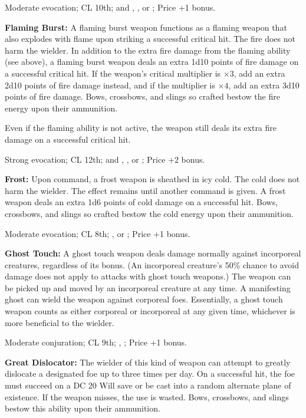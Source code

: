 Moderate evocation; CL 10th;  and , , or ; Price +1 bonus.

\textbf{Flaming Burst:} A flaming burst weapon functions as a flaming weapon that also explodes with flame upon striking a successful critical hit. The fire does not harm the wielder. In addition to the extra fire damage from the flaming ability (see above), a flaming burst weapon deals an extra 1d10 points of fire damage on a successful critical hit. If the weapon's critical multiplier is $\times3$, add an extra 2d10 points of fire damage instead, and if the multiplier is $\times4$, add an extra 3d10 points of fire damage. Bows, crossbows, and slings so crafted bestow the fire energy upon their ammunition.

Even if the flaming ability is not active, the weapon still deals its extra fire damage on a successful critical hit.

Strong evocation; CL 12th;  and , , or ; Price +2 bonus.

\textbf{Frost:} Upon command, a frost weapon is sheathed in icy cold. The cold does not harm the wielder. The effect remains until another command is given. A frost weapon deals an extra 1d6 points of cold damage on a successful hit. Bows, crossbows, and slings so crafted bestow the cold energy upon their ammunition.

Moderate evocation; CL 8th; ,  or ; Price +1 bonus.

\textbf{Ghost Touch:} A ghost touch weapon deals damage normally against incorporeal creatures, regardless of its bonus. (An incorporeal creature's 50\% chance to avoid damage does not apply to attacks with ghost touch weapons.) The weapon can be picked up and moved by an incorporeal creature at any time. A manifesting ghost can wield the weapon against corporeal foes. Essentially, a ghost touch weapon counts as either corporeal or incorporeal at any given time, whichever is more beneficial to the wielder.

Moderate conjuration; CL 9th; , ; Price +1 bonus.

\textbf{Great Dislocator:} The wielder of this kind of weapon can attempt to greatly dislocate a designated foe up to three times per day. On a successful hit, the foe must succeed on a DC 20 Will save or be cast into a random alternate plane of existence. If the weapon misses, the use is wasted. Bows, crossbows, and slings bestow this ability upon their ammunition.

